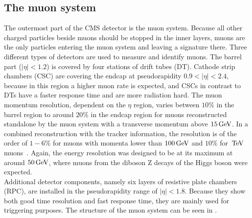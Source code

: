 \subsection{The muon system}
The outermost part of the CMS detector is the muon system. Because all other charged particles beside muons should be stopped in the inner layers, muons are the only particles entering the muon system and leaving a signature there. Three different types of detectors are used to measure and identify muons. The barrel part ($|\eta|<1.2$) is covered by four stations of drift tubes (DT). Cathode strip chambers (CSC) are covering the endcap at pseudorapidity $0.9<|\eta|<2.4$, because in this region a higher muon rate is expected, and CSCs in contrast to DTs have a faster response time and are more radiation hard.
The muon momentum resolution, dependent on the $\eta$ region, varies between $10\%$ in the barrel region to around $20\%$ in the endcap region for muons reconstructed standalone by the muon system with a transverse momentum above $15\,\text{Ge\hspace{-.08em}V}$. In a combined reconstruction with the tracker information, the resolution is of the order of $1-6\%$ for muons with momenta lower than $100\,\text{Ge\hspace{-.08em}V}$ and $10\%$ for $\,\text{Te\hspace{-.08em}V}$ muons~\cite{MuonPerformance}. Again, the energy resolution was designed to be at its maximum at around $50\,\text{Ge\hspace{-.08em}V}$, where muons from the diboson Z decays of the Higgs boson were expected.\\
Additional detector components, namely six layers of resistive plate chambers (RPC), are installed in the pseudorapidity range of $|\eta|<1.8$. Because they show both good time resolution and fast response time, they are mainly used for triggering purposes. The structure of the muon system can be seen in .

